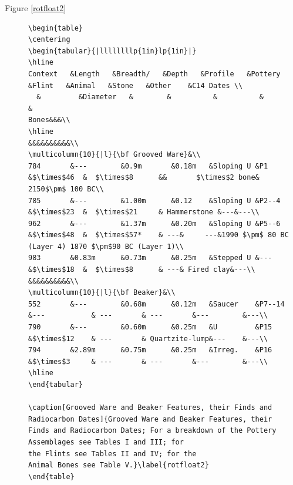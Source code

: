 \documentclass[twoside]{report}
\begin{document}
\begin{description}
\item[Figure \ref{rotfloat2}]
{\scriptsize\begin{verbatim}
\begin{table}
\centering
\begin{tabular}{|llllllllp{1in}lp{1in}|}
\hline
Context   &Length   &Breadth/   &Depth   &Profile   &Pottery   &Flint   &Animal   &Stone   &Other    &C14 Dates \\
  &         &Diameter   &        &          &          &        &
Bones&&&\\
\hline
&&&&&&&&&&\\
\multicolumn{10}{|l}{\bf Grooved Ware}&\\
784       &---        &0.9m       &0.18m   &Sloping U &P1       &$\times$46  &  $\times$8      &&       $\times$2 bone&  2150$\pm$ 100 BC\\
785       &---        &1.00m      &0.12    &Sloping U &P2--4    &$\times$23  &  $\times$21     & Hammerstone &---&---\\
962       &---        &1.37m      &0.20m   &Sloping U &P5--6    &$\times$48  &  $\times$57*    & ---&     ---&1990 $\pm$ 80 BC (Layer 4) 1870 $\pm$90 BC (Layer 1)\\
983       &0.83m      &0.73m      &0.25m   &Stepped U &---      &$\times$18  &  $\times$8      & ---& Fired clay&---\\
&&&&&&&&&&\\
\multicolumn{10}{|l}{\bf Beaker}&\\
552       &---        &0.68m      &0.12m   &Saucer    &P7--14   &---           & ---       & ---       &---        &---\\
790       &---        &0.60m      &0.25m   &U         &P15      &$\times$12    & ---       & Quartzite-lump&---    &---\\
794       &2.89m      &0.75m      &0.25m   &Irreg.    &P16      &$\times$3     & ---       & ---       &---        &---\\
\hline
\end{tabular}

\caption[Grooved Ware and Beaker Features, their Finds and
Radiocarbon Dates]{Grooved Ware and Beaker Features, their
Finds and Radiocarbon Dates; For a breakdown of the Pottery
Assemblages see Tables I and III; for
the Flints see Tables II and IV; for the
Animal Bones see Table V.}\label{rotfloat2}
\end{table}
\end{verbatim}
}


\end{description}
\end{document}
